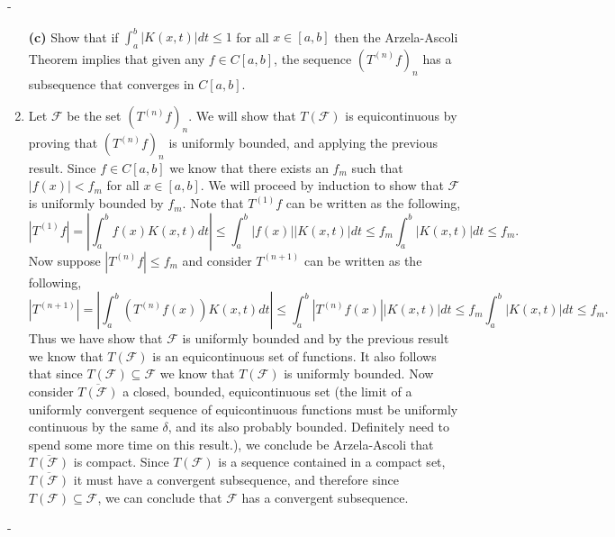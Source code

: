 \documentclass[12pt]{article}
\makeatletter
\theoremstyle{ex215}
\newcounter{probcount}
\newlength\probsep
\newlength\pshrinking
\newenvironment{problems}%
  {\ifhmode\unskip\par\fi\setcounter{probcount}{0}\probsep\parskip
  \sbox\@tempboxa{\textbf{9.}}\pshrinking\wd\@tempboxa\advance\pshrinking\labelsep
  \advance\linewidth -\pshrinking
  \advance\@totalleftmargin\pshrinking
  \advance\leftskip\pshrinking}%
  {\ifhmode\unskip \par\fi\advance\leftskip-\pshrinking}%
\renewenvironment{proof}[1][\proofname]{\par
  \pushQED{\qed}%
  \normalfont \topsep6\p@\@plus6\p@\relax
  \trivlist
  \@topsep \topsep
  \item[\hskip\labelsep
        \itshape
    #1\@addpunct{.}]\ignorespaces
}{%
  \popQED\endtrivlist\@endpefalse
}
\newcommand{\abs}[1]{\left| #1 \right|}
\newcommand{\FF}{\mathcal{F}}
\makeatother
\begin{document}
\begin{problems}
\begin{enumerate}
      \item[\textbf{(c)}] Show that if $\int_{a }^{b }\abs{K(x, t )}dt \leq 1$ for all $x \in [a, b]$ then the Arzela-Ascoli Theorem implies that given any $f \in C[a, b]$, the sequence $(T^{(n)}f)_n$ has a subsequence that converges in $C[a, b]$. 
      \begin{proof} Let $\FF$ be the set $(T^{(n)}f)_n$. We will show that $T(\FF)$ is equicontinuous by proving that $(T^{(n)}f)_n$ is uniformly bounded, and applying the previous result. Since $f \in C[a, b]$ we know that there exists an $f_m$ such that $\abs{f(x)} < f_m$ for all $x \in [a, b]$. We will proceed by induction to show that $\FF$ is uniformly bounded by $f_m$. Note that $T^{(1)}f$ can be written as the following, 
        \begin{equation*}
          |T^{(1)}f| = \abs{\int_{a }^{b }f(x)K(x, t)dt} \leq \int_{a }^{b }\abs{f(x)}\abs{K(x, t)}dt \leq f_m  \int_{a }^{b }\abs{K(x, t)}dt \leq f_m. 
        \end{equation*}
        Now suppose $|T^{(n)}f| \leq f_m$ and consider $T^{(n + 1)}$ can be written as the following, 
        \begin{equation*}
          |T^{(n + 1)}| = \abs{\int_{a }^{b } (T^{(n)}f(x)) K(x, t) dt} \leq \int_{a }^{b } \abs{T^{(n)}f(x)} \abs{K(x, t)} dt \leq f_m \int_{a }^{b }\abs{K(x, t)}dt \leq f_m. 
        \end{equation*}
        Thus we have show that $\FF$ is uniformly bounded and by the previous result we know that $T(\FF)$ is an equicontinuous set of functions. It also follows that since $T(\FF) \subseteq \FF$ we know that $T(\FF)$ is uniformly bounded. Now consider $\overline{T(\FF)}$ a closed, bounded, equicontinuous set (the limit of a uniformly convergent sequence of equicontinuous functions must be uniformly continuous by the same $\delta$, and its also probably bounded. Definitely need to spend some more time on this result.), we conclude be Arzela-Ascoli that $\overline{T(\FF)}$ is compact. Since $T(\FF)$ is a sequence contained in a compact set, $\overline{T(\FF)}$ it must have a convergent subsequence, and therefore since $T(\FF) \subseteq \FF$, we can conclude that $\FF$ has a convergent subsequence. 
      \end{proof}
      \vspace*{.15in}
  \end{enumerate}
  \vspace*{.5in}







\end{problems}
\end{document}

